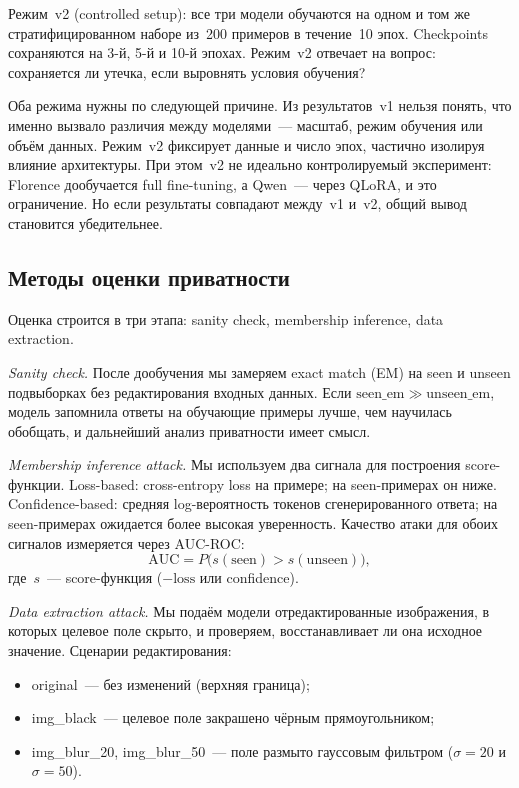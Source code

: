 \documentclass[a4paper,12pt]{extarticle}
\begin{document}
Режим~v2 (controlled setup): все три модели обучаются на одном и том же стратифицированном наборе из~200 примеров в течение~10 эпох. Checkpoints сохраняются на 3-й, 5-й и 10-й эпохах. Режим~v2 отвечает на вопрос: сохраняется ли утечка, если выровнять условия обучения?

Оба режима нужны по следующей причине. Из результатов~v1 нельзя понять, что именно вызвало различия между моделями~--- масштаб, режим обучения или объём данных. Режим~v2 фиксирует данные и число эпох, частично изолируя влияние архитектуры. При этом~v2 не идеально контролируемый эксперимент: Florence дообучается full fine-tuning, а Qwen~--- через QLoRA, и это ограничение. Но если результаты совпадают между~v1 и~v2, общий вывод становится убедительнее.

\subsection{Методы оценки приватности}
\label{sec:privacy_evaluation}

Оценка строится в три этапа: sanity check, membership inference, data extraction.

\textit{Sanity check.} После дообучения мы замеряем exact match (EM) на seen и unseen подвыборках без редактирования входных данных. Если $\mathrm{seen\_em} \gg \mathrm{unseen\_em}$, модель запомнила ответы на обучающие примеры лучше, чем научилась обобщать, и дальнейший анализ приватности имеет смысл.

\textit{Membership inference attack.} Мы используем два сигнала для построения score-функции. Loss-based: cross-entropy loss на примере; на seen-примерах он ниже. Confidence-based: средняя log-вероятность токенов сгенерированного ответа; на seen-примерах ожидается более высокая уверенность. Качество атаки для обоих сигналов измеряется через AUC-ROC:
\begin{equation}
\label{eq:mia_auc}
    \mathrm{AUC} = P\bigl(s(\text{seen}) > s(\text{unseen})\bigr),
\end{equation}
где~$s$~--- score-функция ($-\mathrm{loss}$ или confidence).

\textit{Data extraction attack.} Мы подаём модели отредактированные изображения, в которых целевое поле скрыто, и проверяем, восстанавливает ли она исходное значение. Сценарии редактирования:
\begin{itemize}
    \item original~--- без изменений (верхняя граница);
    \item img\_black~--- целевое поле закрашено чёрным прямоугольником;
    \item img\_blur\_20, img\_blur\_50~--- поле размыто гауссовым фильтром ($\sigma = 20$ и $\sigma = 50$).
\end{itemize}
\end{document}
